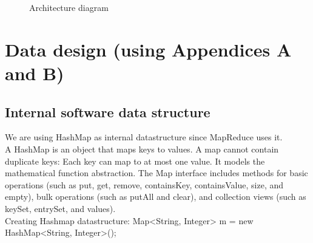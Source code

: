 \documentclass[oneside,a4paper,12pt]{report}
\begin{document}
  \begin{center}
	\begin{figure}[!htbp]
		\centering
	  \caption{Architecture diagram}
	  \label{fig:arch-dig}
	\end{figure}
\end{center} 


\section{Data design (using Appendices A and B)}   

\subsection{Internal software data structure}
We are using HashMap as internal datastructure since MapReduce uses it. \\
A HashMap is an object that maps keys to values. A map cannot contain duplicate keys: Each key can map to at most one value. It models the mathematical function abstraction. The Map interface includes methods for basic operations (such as put, get, remove, containsKey, containsValue, size, and empty), bulk operations (such as putAll and clear), and collection views (such as keySet, entrySet, and values). \\
Creating Hashmap datastructure: Map<String, Integer> m = new HashMap<String, Integer>(); \\ \\
     
\end{document}
